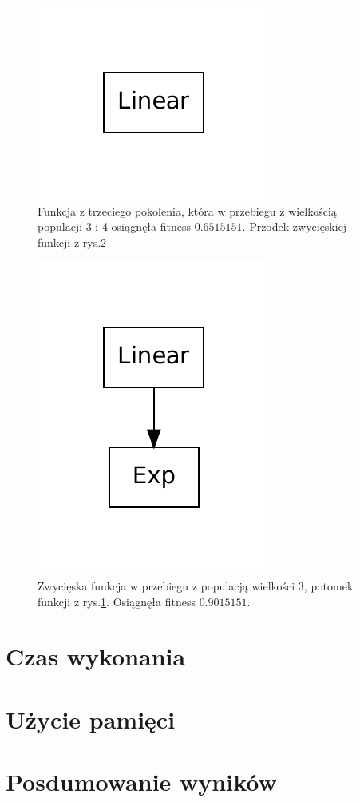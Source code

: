    	\begin{figure}
		\includegraphics[scale=0.60]{figures/functions/func3}
		\caption{Funkcja z trzeciego pokolenia, która w przebiegu z wielkością populacji 3 i 4 osiągnęła fitness $0.6515151$. Przodek zwycięskiej funkcji z rys.\ref{fig:func4}\label{fig:func3}}
	\end{figure}                 

    	\begin{figure}
		\includegraphics[scale=0.60]{figures/functions/func4}
		\caption{Zwycięska funkcja w przebiegu z populacją wielkości 3, potomek funkcji z rys.\ref{fig:func3}. Osiągnęła fitness $0.9015151$. \label{fig:func4}}
	\end{figure} 


		


\section{Czas wykonania}

\section{Użycie pamięci}

\section{Posdumowanie wyników}

\clearpage
